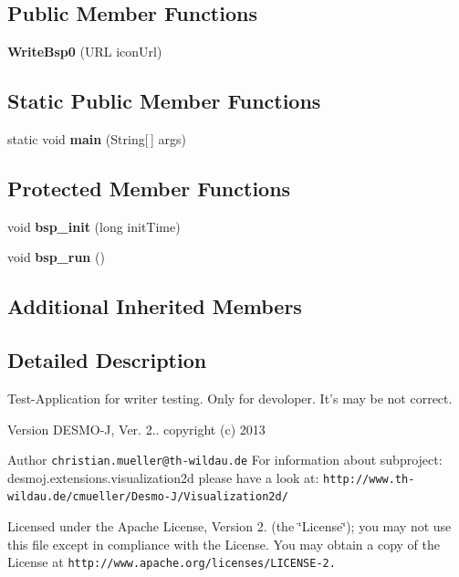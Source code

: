 \subsection*{Public Member Functions}
\begin{DoxyCompactItemize}
\item 
{\bfseries Write\-Bsp0} (U\-R\-L icon\-Url)\label{classdesmoj_1_1extensions_1_1visualization2d_1_1engine_1_1_write_bsp0_a4f35974d34d97866452f23819f9281e5}

\end{DoxyCompactItemize}
\subsection*{Static Public Member Functions}
\begin{DoxyCompactItemize}
\item 
static void {\bfseries main} (String[$\,$] args)\label{classdesmoj_1_1extensions_1_1visualization2d_1_1engine_1_1_write_bsp0_af1d9f312a80debead23c61830c040c13}

\end{DoxyCompactItemize}
\subsection*{Protected Member Functions}
\begin{DoxyCompactItemize}
\item 
void {\bf bsp\-\_\-init} (long init\-Time)
\item 
void {\bf bsp\-\_\-run} ()
\end{DoxyCompactItemize}
\subsection*{Additional Inherited Members}


\subsection{Detailed Description}
Test-\/\-Application for writer testing. Only for devoloper. It's may be not correct.

\begin{DoxyVersion}{Version}
D\-E\-S\-M\-O-\/\-J, Ver. 2.. copyright (c) 2013 
\end{DoxyVersion}
\begin{DoxyAuthor}{Author}
{\tt christian.\-mueller@th-\/wildau.\-de} For information about subproject\-: desmoj.\-extensions.\-visualization2d please have a look at\-: {\tt http\-://www.\-th-\/wildau.\-de/cmueller/\-Desmo-\/\-J/\-Visualization2d/}
\end{DoxyAuthor}
Licensed under the Apache License, Version 2. (the \char`\"{}\-License\char`\"{}); you may not use this file except in compliance with the License. You may obtain a copy of the License at {\tt http\-://www.\-apache.\-org/licenses/\-L\-I\-C\-E\-N\-S\-E-\/2.}

